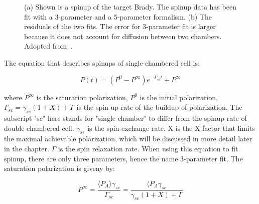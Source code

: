 \begin{figure}[H]
	\label{spinup}
	\centering
	\caption{{(a) Shown is a spinup of the target Brady. The spinup data has been fit with a 3-parameter and a 5-parameter formalism. (b) The residuals of the two fits. The error for 3-parameter fit is larger because it does not account for diffusion between two chambers. Adopted from~\cite{PhysRevC.91.055205}.}}
\end{figure}

The equation that describes spinups of single-chambered cell is: 

\begin{equation}
P(t)=(P^{0}-P^{\infty})e^{-\Gamma_{sc}t}+P^{\infty}
\end{equation}

where $P^{\infty}$ is the saturation polarization, $P^{0}$ is the initial polarization, $\Gamma_{sc}=\gamma_{se}(1+X)+\Gamma$ is the spin up rate of the buildup of polarization. The subscript "sc" here stands for "single chamber" to differ from the spinup rate of double-chambered cell. $\gamma_{se}$ is the spin-exchange rate, X is the X factor that limits the maximal achievable polarization, which will be discussed in more detail later in the chapter. $\Gamma$ is the spin relaxation rate. When using this equation to fit spinup, there are only three parameters, hence the name 3-parameter fit. The saturation polarization is giveny by:

\begin{equation}
P^{\infty}=\frac{\langle P_{A}\rangle \gamma_{se}}{\Gamma_{sc}}=\frac{\langle P_{A}\gamma_{se}}{\gamma_{se}(1+X)+\Gamma}
\end{equation}

